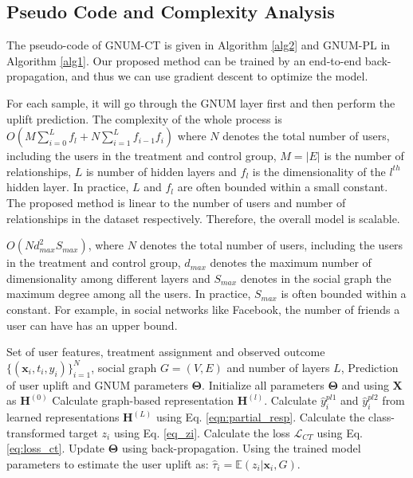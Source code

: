 \subsection{Pseudo Code and Complexity Analysis}
\label{appx:code}
The pseudo-code of GNUM-CT is given in Algorithm \ref{alg2} and GNUM-PL in Algorithm \ref{alg1}. Our proposed method can be trained by an end-to-end back-propagation, and thus we can use gradient descent to optimize the model.

For each sample, it will go through the GNUM layer first and then perform the uplift prediction. The complexity of the whole process is
$O\left(M\sum_{i=0}^L f_l+N \sum_{i=1}^L f_{i-1}f_i \right)$ where $N$ denotes the total number of users, including the users in the treatment and control group, $M = \left| \mathit{E}\right|$ is the number of relationships, $L$ is number of hidden layers and $f_l$ is the dimensionality of the $l^{th}$ hidden layer. In practice, $L$ and $f_l$ are often bounded within a small constant. The proposed method is linear to the number of users and number of relationships in the dataset respectively. Therefore, the overall model is scalable. 

$O(Nd^2_{max}S_{max})$, where $N$ denotes the total number of users, including the users in the treatment and control group, $d_{max}$ denotes the maximum number of dimensionality among different layers and $S_{max}$ denotes in the social graph the maximum degree among all the users. In practice, $S_{max}$ is often bounded within a constant. For example, in social networks like Facebook, the number of friends a user can have has an upper bound. 

\begin{algorithm}[t]\caption{Graph Neural Network for Uplift Modeling (GNUM) using Class-Transformed Target} \label{alg2}
	\begin{algorithmic}[1]
		\REQUIRE Set of user features, treatment assignment and observed outcome $\{(\mathbf{x}_i,t_i,y_i)\}_{i=1}^N$, social graph $\mathit{G}=(\mathit{V},\mathit{E})$ and number of layers $L$, 
		\ENSURE Prediction of user uplift and GNUM parameters $\mathbf{\Theta}$.
		\STATE Initialize all parameters $\mathbf{\Theta}$ and using $\mathbf{X}$ as $\mathbf{H}^{(0)}$
		\STATE Calculate graph-based representation $\mathbf{H}^{(l)}$.
		\ENDFOR
		\STATE Calculate  $\hat{y}_i^{pl1}$ and $\hat{y}_i^{pl2}$  from learned representations $\mathbf{H}^{(L)}$ using Eq. \eqref{eqn:partial_resp}.
		\STATE Calculate the class-transformed target $z_i$ using Eq. \eqref{eq_zi}.
		\STATE Calculate the loss $\mathcal{L}_{CT}$ using Eq. \eqref{eq:loss_ct}.
		\STATE Update $\mathbf{\Theta}$ using back-propagation.
		\ENDWHILE
		\STATE Using the trained model parameters to estimate the user uplift as: $\hat{\tau}_i=\mathbb{E}(z_i|\mathbf{x}_i, \mathit{G})$.
	\end{algorithmic}
\end{algorithm}

